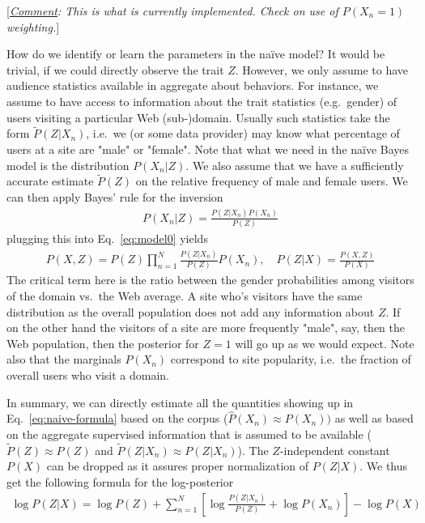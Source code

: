 \documentclass{article}
\newcommand{\comment}[1]{{[\small \textit{\underline{Comment}: #1}]}}
\begin{document}
\comment{This is what is currently implemented. Check on use of $P(X_n=1)$ weighting.} 

How do we identify or learn the parameters in the na\"ive model? It would be trivial, if we could directly observe the trait $Z$. However, we only assume to have audience statistics available in aggregate about behaviors. For instance, we assume to have access to information about the trait statistics (e.g.~gender) of users visiting a particular Web (sub-)domain. Usually such statistics take the form  $\tilde P(Z | X_n)$, i.e.~we (or some data provider) may know what percentage of users at a site are "male" or "female".  Note that what we need in the na\"ive Bayes model is the distribution $P(X_n|Z)$. We also assume that we have a sufficiently accurate estimate $\tilde P(Z)$ on the relative frequency of male and female users. We can then apply Bayes' rule for the inversion 
\begin{align}
P(X_n|Z) = \frac{P(Z|X_n) P(X_n)}{P(Z)}
\end{align}
plugging this into Eq.~\eqref{eq:model0} yields
\begin{align}
P(X,Z) = P(Z)  \prod_{n=1}^N \frac{P(Z|X_n)}{P(Z)} P(X_n), \quad 
P(Z|X) = \frac{P(X,Z)}{P(X)}
\label{eq:naive-formula}
\end{align}
The critical term here is the ratio between the gender probabilities among visitors of the domain vs.~the Web average. A site who's visitors have the same distribution as the overall population does not add any information about $Z$.  If on the other hand the visitors of a site are more frequently "male", say,  then the Web population, then the posterior for $Z=1$ will go up as we would expect. Note also that the marginals $P(X_n)$ correspond to site popularity, i.e.~the fraction of overall users who visit a domain. 

In summary, we can directly estimate all the quantities showing up in Eq.~\eqref{eq:naive-formula} based on the corpus ($\hat P(X_n) \approx P(X_n))$ as well as based on the aggregate supervised information that is assumed to be available ($\tilde P(Z) \approx P(Z)$ and $\tilde P(Z|X_n) \approx P(Z|X_n)$). The $Z$-independent constant $P(X)$ can be dropped as it assures proper normalization of $P(Z|X)$. 
%
We thus get the following formula for the log-posterior
\begin{align}
\log P(Z|X)
= \log P(Z)+  \sum_{n=1}^N \left[ \log \frac{P(Z|X_n)}{P(Z)}+ \log P(X_n) \right] - \log P(X)
\label{eq:log-posterior}
\end{align}
\end{document}
